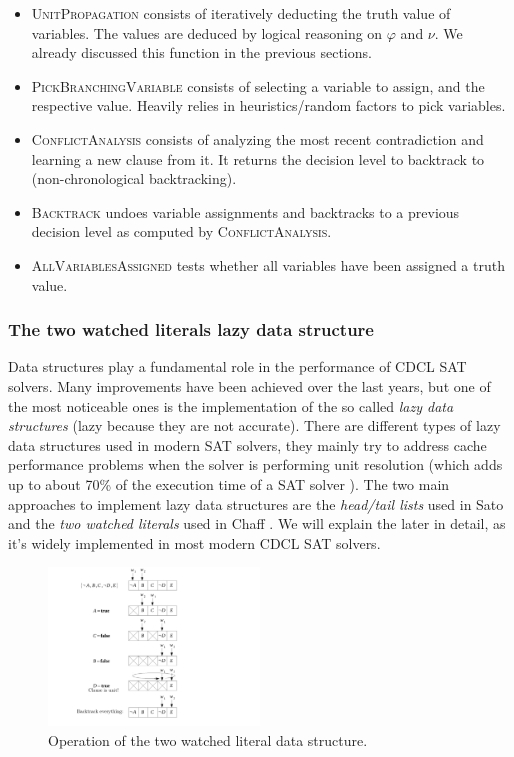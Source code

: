 \documentclass[12pt]{diicc}
\begin{document}
\begin{itemize}
	\item \textsc{UnitPropagation} consists of iteratively deducting the truth value of variables. The values are deduced by logical reasoning on $\varphi$ and $\nu$. We already discussed this function in the previous sections.
	\item \textsc{PickBranchingVariable} consists of selecting a variable to assign, and the respective value. Heavily relies in heuristics/random factors to pick variables.
	\item \textsc{ConflictAnalysis} consists of analyzing the most recent contradiction and learning a new clause from it. It returns the decision level to backtrack to (non-chronological backtracking).
	\item \textsc{Backtrack} undoes variable assignments and backtracks to a previous decision level as computed by \textsc{ConflictAnalysis}.
	\item \textsc{AllVariablesAssigned} tests whether all variables have been assigned a truth value.
\end{itemize}


\subsubsection{The two watched literals lazy data structure}

Data structures play a fundamental role in the performance of CDCL SAT solvers. Many improvements have been achieved over the last years, but one of the most noticeable ones is the implementation of the so called \textit{lazy data structures} (lazy because they are not accurate). There are different types of lazy data structures used in modern SAT solvers, they mainly try to address cache performance problems when the solver is performing unit resolution (which adds up to about 70\% of the execution time of a SAT solver \cite{NEEDED}). The two main approaches to implement lazy data structures are the \textit{head/tail lists} used in Sato \cite{sato} and the \textit{two watched literals} used in Chaff \cite{chaff}. We will explain the later in detail, as it's widely implemented in most modern CDCL SAT solvers.

\begin{figure}[h!]
	\centering
		\includegraphics[width=0.5\textwidth]{watchedliterals}
	\caption{Operation of the two watched literal data structure.}
	\label{fig:watched literals}
\end{figure}
\end{document}
